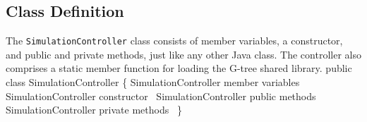 \documentclass{article}
\def\nwendcode{\endtrivlist \endgroup}      %
\let\nwdocspar=\par
\begin{document}
\subsection{Class Definition}
\label{sec:class-definition}
The {\tt{}SimulationController} class consists of member variables, a constructor,
and public and private methods, just like any other Java class. The controller
also comprises a static member function for loading the G-tree shared library.
\nwenddocs{}\endmoddef{}
public class SimulationController \{
  \LA{}\code{}SimulationController\edoc{} member variables~{\nwtagstyle{}}\RA{}
  \LA{}\code{}SimulationController\edoc{} constructor~{\nwtagstyle{}}\RA{}
  \LA{}\code{}SimulationController\edoc{} public methods~{\nwtagstyle{}}\RA{}
  \LA{}\code{}SimulationController\edoc{} private methods~{\nwtagstyle{}}\RA{}
\}
\nwendcode{}\nwdocspar
\end{document}
